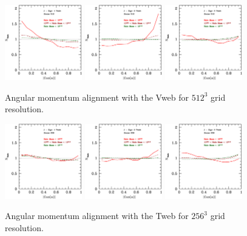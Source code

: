 \documentclass[usenatbib]{mn2e}
\begin{document}
\begin{figure}
\includegraphics[width=0.30\textwidth]{../plot2/J/512_J_V1.ps}
\includegraphics[width=0.30\textwidth]{../plot2/J/512_J_V2.ps}
\includegraphics[width=0.30\textwidth]{../plot2/J/512_J_V3.ps}
\caption{Angular momentum alignment with the Vweb for $512^3$ grid resolution.}
\end{figure}


\begin{figure}
\includegraphics[width=0.30\textwidth]{../plot2/J/256_J_T1.ps}
\includegraphics[width=0.30\textwidth]{../plot2/J/256_J_T2.ps}
\includegraphics[width=0.30\textwidth]{../plot2/J/256_J_T3.ps}
\caption{Angular momentum alignment with the Tweb for $256^3$ grid resolution.}
\end{figure}
\end{document}

